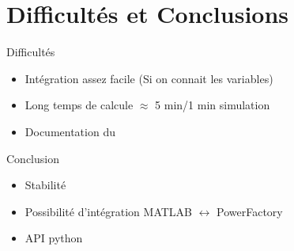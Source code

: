 \section{Difficultés et Conclusions}


\begin{frame}{Difficultés}
\pause
\begin{itemize}
	\item Intégration assez facile \pause (Si on connait les variables)
	\item Long temps de calcule $ \approx $ 5 min/1 min simulation 
	\item Documentation du \powerfactory
\end{itemize}
\end{frame}

\begin{frame}{Conclusion}
\begin{itemize}
	\item Stabilité
	\item Possibilité d'intégration MATLAB $ \leftrightarrow $ PowerFactory
	\item API python 
\end{itemize}
\end{frame}